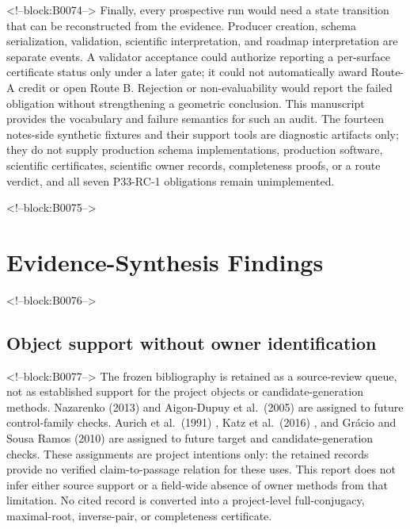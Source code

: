 \documentclass[11pt,a4paper]{article}
\begin{document}
<!--block:B0074-->
Finally, every prospective run would need a state transition that can be reconstructed from the evidence. Producer creation, schema serialization, validation, scientific interpretation, and roadmap interpretation are separate events. A validator acceptance could authorize reporting a per-surface certificate status only under a later gate; it could not automatically award Route-A credit or open Route B. Rejection or non-evaluability would report the failed obligation without strengthening a geometric conclusion. This manuscript provides the vocabulary and failure semantics for such an audit. The fourteen notes-side synthetic fixtures and their support tools are diagnostic artifacts only; they do not supply production schema implementations, production software, scientific certificates, scientific owner records, completeness proofs, or a route verdict, and all seven P33-RC-1 obligations remain unimplemented.

<!--block:B0075-->
\hypertarget{evidence-synthesis-findings}{%
\section{Evidence-Synthesis Findings}\label{evidence-synthesis-findings}}

<!--block:B0076-->
\hypertarget{object-support-without-owner-identification}{%
\subsection{Object support without owner identification}\label{object-support-without-owner-identification}}

<!--block:B0077-->
The frozen bibliography is retained as a source-review queue, not as established support for the project objects or candidate-generation methods. Nazarenko (2013)
\citep{P33-S01}
 and Aigon-Dupuy et al.~(2005)
\citep{P33-S02}
 are assigned to future control-family checks. Aurich et al.~(1991)
\citep{P33-S05}
, Katz et al.~(2016)
\citep{P33-S08}
, and Grácio and Sousa Ramos (2010)
\citep{P33-S09}
 are assigned to future target and candidate-generation checks. These assignments are project intentions only: the retained records provide no verified claim-to-passage relation for these uses. This report does not infer either source support or a field-wide absence of owner methods from that limitation. No cited record is converted into a project-level full-conjugacy, maximal-root, inverse-pair, or completeness certificate.
\end{document}

